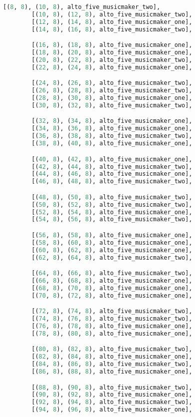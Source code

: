 \begin{lstlisting}[language=Python, caption=Invocation Source Code]
        [(8, 8), (10, 8), alto_five_musicmaker_two],
        [(10, 8), (12, 8), alto_five_musicmaker_two],
        [(12, 8), (14, 8), alto_five_musicmaker_one],
        [(14, 8), (16, 8), alto_five_musicmaker_two],

        [(16, 8), (18, 8), alto_five_musicmaker_one],
        [(18, 8), (20, 8), alto_five_musicmaker_one],
        [(20, 8), (22, 8), alto_five_musicmaker_two],
        [(22, 8), (24, 8), alto_five_musicmaker_one],

        [(24, 8), (26, 8), alto_five_musicmaker_two],
        [(26, 8), (28, 8), alto_five_musicmaker_two],
        [(28, 8), (30, 8), alto_five_musicmaker_one],
        [(30, 8), (32, 8), alto_five_musicmaker_two],

        [(32, 8), (34, 8), alto_five_musicmaker_one],
        [(34, 8), (36, 8), alto_five_musicmaker_one],
        [(36, 8), (38, 8), alto_five_musicmaker_two],
        [(38, 8), (40, 8), alto_five_musicmaker_one],

        [(40, 8), (42, 8), alto_five_musicmaker_one],
        [(42, 8), (44, 8), alto_five_musicmaker_two],
        [(44, 8), (46, 8), alto_five_musicmaker_one],
        [(46, 8), (48, 8), alto_five_musicmaker_two],

        [(48, 8), (50, 8), alto_five_musicmaker_two],
        [(50, 8), (52, 8), alto_five_musicmaker_two],
        [(52, 8), (54, 8), alto_five_musicmaker_one],
        [(54, 8), (56, 8), alto_five_musicmaker_two],

        [(56, 8), (58, 8), alto_five_musicmaker_one],
        [(58, 8), (60, 8), alto_five_musicmaker_one],
        [(60, 8), (62, 8), alto_five_musicmaker_one],
        [(62, 8), (64, 8), alto_five_musicmaker_two],

        [(64, 8), (66, 8), alto_five_musicmaker_two],
        [(66, 8), (68, 8), alto_five_musicmaker_one],
        [(68, 8), (70, 8), alto_five_musicmaker_one],
        [(70, 8), (72, 8), alto_five_musicmaker_one],

        [(72, 8), (74, 8), alto_five_musicmaker_two],
        [(74, 8), (76, 8), alto_five_musicmaker_two],
        [(76, 8), (78, 8), alto_five_musicmaker_one],
        [(78, 8), (80, 8), alto_five_musicmaker_one],

        [(80, 8), (82, 8), alto_five_musicmaker_two],
        [(82, 8), (84, 8), alto_five_musicmaker_one],
        [(84, 8), (86, 8), alto_five_musicmaker_two],
        [(86, 8), (88, 8), alto_five_musicmaker_one],

        [(88, 8), (90, 8), alto_five_musicmaker_two],
        [(90, 8), (92, 8), alto_five_musicmaker_one],
        [(92, 8), (94, 8), alto_five_musicmaker_two],
        [(94, 8), (96, 8), alto_five_musicmaker_one],


\end{lstlisting}
